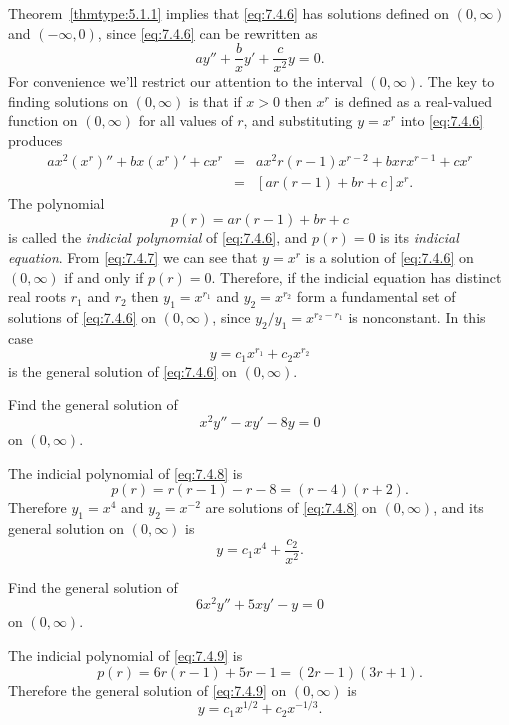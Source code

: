 \documentclass{ximera}
\begin{document}
Theorem~\ref{thmtype:5.1.1} implies that \eqref{eq:7.4.6} has
solutions defined on $(0,\infty)$ and $(-\infty,0)$,
since \eqref{eq:7.4.6} can be rewritten as
$$
ay''+\frac{b}{x}y'+\frac{c}{x^2}y=0.
$$
For convenience we'll restrict our attention to the interval
$(0,\infty)$. 
The key to finding solutions on
$(0,\infty)$ is  that if $x>0$ then $x^r$ is defined as a
real-valued function on $(0,\infty)$ for all values of $r$, and
substituting $y=x^r$ into \eqref{eq:7.4.6} produces
\begin{equation} \label{eq:7.4.7}
\begin{array}{lcl}
ax^2(x^r)''+bx(x^r)'+cx^r&=&ax^2r(r-1)x^{r-2}+bxrx^{r-1}+cx^r\\
&=&[ar(r-1)+br+c]x^r.
\end{array}
\end{equation}
The polynomial
$$
p(r)=ar(r-1)+br+c
$$
is called the \textit{indicial polynomial} of \eqref{eq:7.4.6}, and
$p(r)=0$
is its \textit{indicial equation}. From \eqref{eq:7.4.7} we can
see that
$y=x^r$ is a solution of \eqref{eq:7.4.6} on $(0,\infty)$ if and only if
$p(r)=0$. Therefore, if the indicial equation has distinct real roots
$r_1$ and $r_2$ then $y_1=x^{r_1}$ and $y_2=x^{r_2}$ form a
fundamental set of solutions of \eqref{eq:7.4.6} on
$(0,\infty)$, since $y_2/y_1=x^{r_2-r_1}$ is nonconstant.
In this case
$$
y=c_1x^{r_1}+c_2x^{r_2}
$$
is the general solution of \eqref{eq:7.4.6} on $(0,\infty)$.

\begin{example}\label{example:7.4.4}
 Find the general solution of
\begin{equation} \label{eq:7.4.8}
x^2y''-xy'-8y=0
\end{equation}
on  $(0,\infty)$.
\begin{explanation}
The indicial polynomial of \eqref{eq:7.4.8} is
$$
p(r)=r(r-1)-r-8=(r-4)(r+2).
$$
Therefore $y_1=x^4$ and $y_2=x^{-2}$ are solutions of \eqref{eq:7.4.8} on
$(0,\infty)$, and its general solution on $(0,\infty)$ is
$$
y=c_1x^4+\frac{c_2}{x^2}.
$$
\end{explanation}
\end{example}

\begin{example}\label{example:7.4.5}
  Find the general solution of
\begin{equation} \label{eq:7.4.9}
6x^2y''+5xy'-y=0
\end{equation}
on  $(0,\infty)$.
\begin{explanation}
The indicial polynomial of \eqref{eq:7.4.9} is
$$
p(r)=6r(r-1)+5r-1=(2r-1)(3r+1).
$$
Therefore the general solution of \eqref{eq:7.4.9} on
$(0,\infty)$ is
$$
y=c_1x^{1/2}+c_2x^{-1/3}.
$$
\end{explanation}
\end{example}
\end{document}
